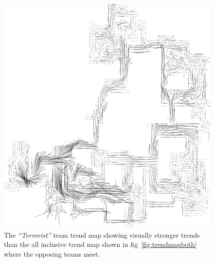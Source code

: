 \documentclass[journal]{IEEEtran}
\begin{document}
\begin{figure}[h]
    \centering
    \includegraphics[width=\linewidth]{TrendMapT.png}
    \caption{The \textit{``Terrorist''} team trend map showing visually stronger trends than the all inclusive trend map shown in fig~\ref{fig:trendmapboth} where the opposing teams meet.}
    \label{fig:trendmap_t}
\end{figure}
\end{document}
